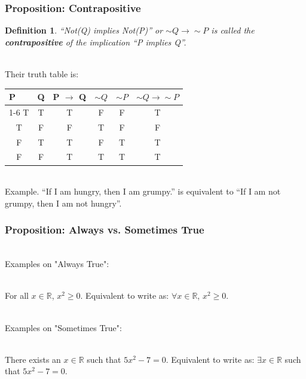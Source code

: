 \documentclass[aspectratio=169]{beamer}
\newtheorem{defn}{Definition}
\numberwithin{equation}{section}
\begin{document}
\begin{frame}
\frametitle{Proposition: Contrapositive}

\begin{defn}
``Not(Q) implies Not(P)'' or  $\sim Q \rightarrow \sim P$ is called the \textbf{contrapositive} of the implication ``P implies Q''. \end{defn} \pause

\ \\Their truth table is:

\begin{table}[]
\begin{tabular}{cc|c|cc|c}
\multicolumn{1}{l}{P} & \multicolumn{1}{l}{Q} & \multicolumn{1}{l}{P $\rightarrow$ Q} & $\sim Q$& $\sim P$& $\sim Q \rightarrow \sim P$   \\ \cline{1-6}
T                     & T                     & T       &     F    &     F          & T                       \\
T                     & F                     & F        &     T     &     F        & F                       \\
F                     & T                     & T          &    F       &    T      & T                       \\
F                     & F                     & T           &    T        &    T    & T                     
\end{tabular}
\end{table} \pause

\ \\Example. ``If I am hungry, then I am grumpy.'' is equivalent to ``If I am not grumpy, then I am not hungry''. 

\end{frame}



\begin{frame}
\frametitle{Proposition: Always vs. Sometimes True}

\ \\Examples on "Always True": \pause

\ \\For all $x \in \mathbb{R}$, $x^{2} \geq 0$. Equivalent to write as: $\forall x \in \mathbb{R}$, $x^{2} \geq 0$. \pause

\ \\Examples on "Sometimes True": \pause

\ \\There exists an $x \in \mathbb{R}$ such that $5 x^{2} - 7 = 0$. Equivalent to write as: $\exists x \in \mathbb{R}$ such that $5 x^{2} - 7 = 0$.

\end{frame}
\end{document}
